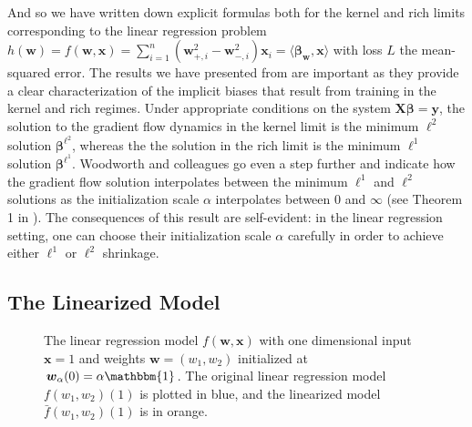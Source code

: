 \documentclass{article}
\begin{document}
And so we have written down explicit formulas both for the kernel and rich limits corresponding to the linear regression problem $h(\boldsymbol{w}) = f(\boldsymbol{w}, \boldsymbol{x}) = \sum_{i=1}^n(\boldsymbol{w}_{+, i}^2 - \boldsymbol{w}_{-, i}^2)\boldsymbol{x}_i = \langle \boldsymbol{\beta}_{\boldsymbol{w}}, \boldsymbol{x} \rangle $ with loss $L$ the mean-squared error. The results we have presented from \cite{woodworth2020kernel} are important as they provide a clear characterization of the implicit biases that result from training in the kernel and rich regimes. Under appropriate conditions on the system $\boldsymbol{X} \boldsymbol{\beta} = \boldsymbol{y}$, the solution to the gradient flow dynamics in the kernel limit is the minimum $\ell^2$ solution $\boldsymbol{\beta}^{\ell^2}$, whereas the the solution in the rich limit is the minimum $\ell^1$ solution $\boldsymbol{\beta}^{\ell^1}$. Woodworth and colleagues go even a step further and indicate how the gradient flow solution interpolates between the minimum $\ell^1$ and $\ell^2 $ solutions as the initialization scale $\alpha$ interpolates between $0$ and $\infty$ (see Theorem 1 in \cite{woodworth2020kernel}). The consequences of this result are self-evident: in the linear regression setting, one can choose their initialization scale $\alpha$ carefully in order to achieve either $\ell^1$ or $\ell^2$ shrinkage.

\subsection{The Linearized Model}

\begin{figure}[H]
    \centering
    \hfill
    \caption{The linear regression model $f(\boldsymbol{w}, \boldsymbol{x})$ with one dimensional input $\boldsymbol{x} = 1$ and weights $\boldsymbol{w} = (w_1, w_2)$ initialized at $\boldsymbol{w}_{\alpha}(0) = \alpha \mathbbm{1}$. The original linear regression model $f(w_1, w_2)(1)$ is plotted in blue, and the linearized model $\bar{f}(w_1, w_2)(1)$ is in orange.}\label{img:linearization}
\end{figure}
\end{document}

